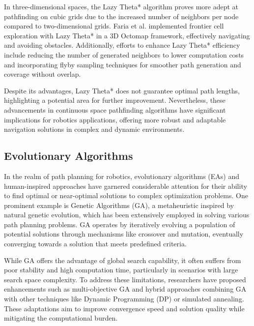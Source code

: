\vspace*{6mm}

In three-dimensional spaces, the Lazy Theta* algorithm proves more adept at pathfinding on cubic grids due to the increased number of neighbors per node compared to two-dimensional grids. Faria et al. implemented frontier cell exploration with Lazy Theta* in a 3D Octomap framework, effectively navigating and avoiding obstacles. Additionally, efforts to enhance Lazy Theta* efficiency include reducing the number of generated neighbors to lower computation costs and incorporating flyby sampling techniques for smoother path generation and coverage without overlap.

\vspace*{6mm}

Despite its advantages, Lazy Theta* does not guarantee optimal path lengths, highlighting a potential area for further improvement. Nevertheless, these advancements in continuous space pathfinding algorithms have significant implications for robotics applications, offering more robust and adaptable navigation solutions in complex and dynamic environments.


\subsection{Evolutionary Algorithms}


In the realm of path planning for robotics, evolutionary algorithms (EAs) and human-inspired approaches have garnered considerable attention for their ability to find optimal or near-optimal solutions to complex optimization problems. One prominent example is Genetic Algorithms (GA), a metaheuristic inspired by natural genetic evolution, which has been extensively employed in solving various path planning problems. GA operates by iteratively evolving a population of potential solutions through mechanisms like crossover and mutation, eventually converging towards a solution that meets predefined criteria.

\vspace*{6mm}


While GA offers the advantage of global search capability, it often suffers from poor stability and high computation time, particularly in scenarios with large search space complexity. To address these limitations, researchers have proposed enhancements such as multi-objective GA and hybrid approaches combining GA with other techniques like Dynamic Programming (DP) or simulated annealing. These adaptations aim to improve convergence speed and solution quality while mitigating the computational burden.

